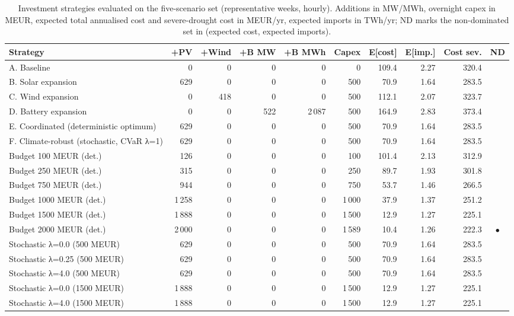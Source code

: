 \begin{table}[htbp]
\centering
\scriptsize
\caption{Investment strategies evaluated on the five-scenario set (representative weeks, hourly). Additions in MW/MWh, overnight capex in MEUR, expected total annualised cost and severe-drought cost in MEUR/yr, expected imports in TWh/yr; ND marks the non-dominated set in (expected cost, expected imports).}
\label{tab:strategies}
\begin{adjustbox}{max width=\linewidth}
\begin{tabular}{p{4.2cm}rrrrrrrrc}
\toprule
Strategy & +PV & +Wind & +B MW & +B MWh & Capex & E[cost] & E[imp.] & Cost sev. & ND \\
\midrule
A. Baseline & 0 & 0 & 0 & 0 & 0 & 109.4 & 2.27 & 320.4 &  \\
B. Solar expansion & 629 & 0 & 0 & 0 & 500 & 70.9 & 1.64 & 283.5 &  \\
C. Wind expansion & 0 & 418 & 0 & 0 & 500 & 112.1 & 2.07 & 323.7 &  \\
D. Battery expansion & 0 & 0 & 522 & 2\,087 & 500 & 164.9 & 2.83 & 373.4 &  \\
E. Coordinated (deterministic optimum) & 629 & 0 & 0 & 0 & 500 & 70.9 & 1.64 & 283.5 &  \\
F. Climate-robust (stochastic, CVaR λ=1) & 629 & 0 & 0 & 0 & 500 & 70.9 & 1.64 & 283.5 &  \\
Budget 100 MEUR (det.) & 126 & 0 & 0 & 0 & 100 & 101.4 & 2.13 & 312.9 &  \\
Budget 250 MEUR (det.) & 315 & 0 & 0 & 0 & 250 & 89.7 & 1.93 & 301.8 &  \\
Budget 750 MEUR (det.) & 944 & 0 & 0 & 0 & 750 & 53.7 & 1.46 & 266.5 &  \\
Budget 1000 MEUR (det.) & 1\,258 & 0 & 0 & 0 & 1\,000 & 37.9 & 1.37 & 251.2 &  \\
Budget 1500 MEUR (det.) & 1\,888 & 0 & 0 & 0 & 1\,500 & 12.9 & 1.27 & 225.1 &  \\
Budget 2000 MEUR (det.) & 2\,000 & 0 & 0 & 0 & 1\,589 & 10.4 & 1.26 & 222.3 & $\bullet$ \\
Stochastic λ=0.0 (500 MEUR) & 629 & 0 & 0 & 0 & 500 & 70.9 & 1.64 & 283.5 &  \\
Stochastic λ=0.25 (500 MEUR) & 629 & 0 & 0 & 0 & 500 & 70.9 & 1.64 & 283.5 &  \\
Stochastic λ=4.0 (500 MEUR) & 629 & 0 & 0 & 0 & 500 & 70.9 & 1.64 & 283.5 &  \\
Stochastic λ=0.0 (1500 MEUR) & 1\,888 & 0 & 0 & 0 & 1\,500 & 12.9 & 1.27 & 225.1 &  \\
Stochastic λ=4.0 (1500 MEUR) & 1\,888 & 0 & 0 & 0 & 1\,500 & 12.9 & 1.27 & 225.1 &  \\
\bottomrule
\end{tabular}
\end{adjustbox}
\end{table}
